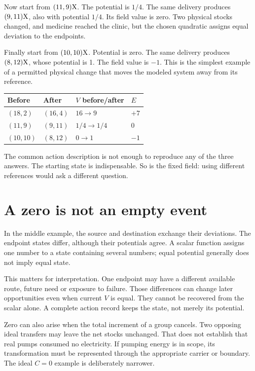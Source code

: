 Now start from $(11,9)\mathrm{X}$. The potential is $1/4$. The same delivery produces $(9,11)\mathrm{X}$, also with potential $1/4$. Its field value is zero. Two physical stocks changed, and medicine reached the clinic, but the chosen quadratic assigns equal deviation to the endpoints.

Finally start from $(10,10)\mathrm{X}$. Potential is zero. The same delivery produces $(8,12)\mathrm{X}$, whose potential is 1. The field value is $-1$. This is the simplest example of a permitted physical change that moves the modeled system away from its reference.

\begin{center}
\begin{tabular}{llll}\toprule
Before & After & $V$ before/after & $E$\\\midrule
$(18,2)$ & $(16,4)$ & $16\to9$ & $+7$\\
$(11,9)$ & $(9,11)$ & $1/4\to1/4$ & $0$\\
$(10,10)$ & $(8,12)$ & $0\to1$ & $-1$\\\bottomrule
\end{tabular}
\end{center}

The common action description is not enough to reproduce any of the three answers. The starting state is indispensable. So is the fixed field: using different references would ask a different question.

\section{A zero is not an empty event}
In the middle example, the source and destination exchange their deviations. The endpoint states differ, although their potentials agree. A scalar function assigns one number to a state containing several numbers; equal potential generally does not imply equal state.

This matters for interpretation. One endpoint may have a different available route, future need or exposure to failure. Those differences can change later opportunities even when current $V$ is equal. They cannot be recovered from the scalar alone. A complete action record keeps the state, not merely its potential.

Zero can also arise when the total increment of a group cancels. Two opposing ideal transfers may leave the net stocks unchanged. That does not establish that real pumps consumed no electricity. If pumping energy is in scope, its transformation must be represented through the appropriate carrier or boundary. The ideal $C=0$ example is deliberately narrower.

